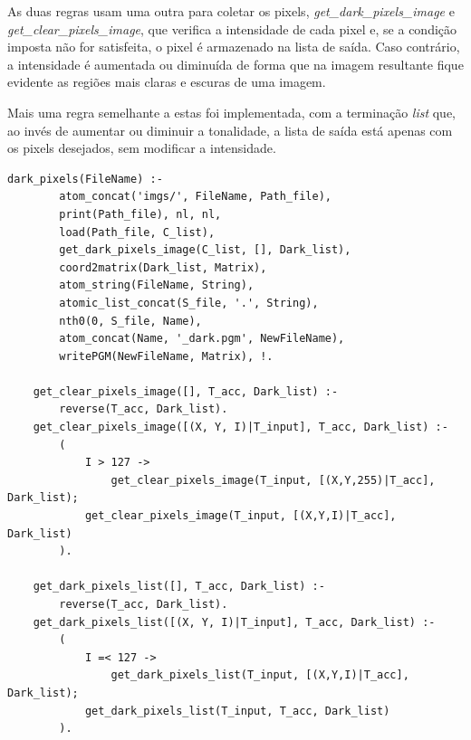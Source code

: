 \documentclass{article}
\begin{document}
        As duas regras usam uma outra para coletar os pixels, \textit{get\_dark\_pixels\_image} e \textit{get\_clear\_pixels\_image}, que verifica a intensidade de cada pixel e, se a condição imposta não for satisfeita, o pixel é armazenado na lista de saída. Caso contrário, a intensidade é aumentada ou diminuída de forma que na imagem resultante fique evidente as regiões mais claras e escuras de uma imagem.
        
        Mais uma regra semelhante a estas foi implementada, com a terminação \textit{list} que, ao invés de aumentar ou diminuir a tonalidade, a lista de saída está apenas com os pixels desejados, sem modificar a intensidade.
        \begin{lstlisting}[frame=single]
    dark_pixels(FileName) :-
        atom_concat('imgs/', FileName, Path_file),
        print(Path_file), nl, nl,
        load(Path_file, C_list),
        get_dark_pixels_image(C_list, [], Dark_list),
        coord2matrix(Dark_list, Matrix),
        atom_string(FileName, String),
        atomic_list_concat(S_file, '.', String),
        nth0(0, S_file, Name),
        atom_concat(Name, '_dark.pgm', NewFileName),
        writePGM(NewFileName, Matrix), !.
    
    get_clear_pixels_image([], T_acc, Dark_list) :-
        reverse(T_acc, Dark_list).
    get_clear_pixels_image([(X, Y, I)|T_input], T_acc, Dark_list) :-
        (
            I > 127 ->
                get_clear_pixels_image(T_input, [(X,Y,255)|T_acc], Dark_list);
            get_clear_pixels_image(T_input, [(X,Y,I)|T_acc], Dark_list)
        ).
        
    get_dark_pixels_list([], T_acc, Dark_list) :-
        reverse(T_acc, Dark_list).
    get_dark_pixels_list([(X, Y, I)|T_input], T_acc, Dark_list) :-
        (
            I =< 127 ->
                get_dark_pixels_list(T_input, [(X,Y,I)|T_acc], Dark_list);
            get_dark_pixels_list(T_input, T_acc, Dark_list)
        ).
        \end{lstlisting}
\end{document}
